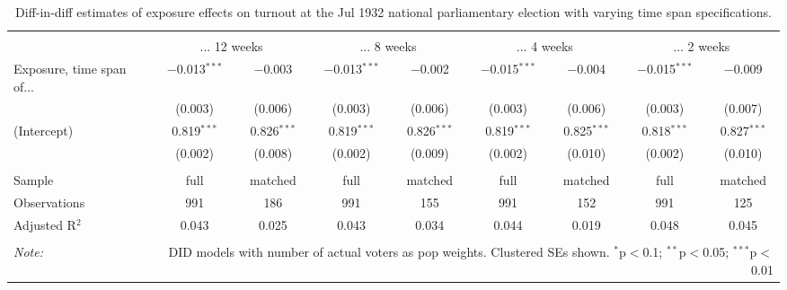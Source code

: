 
\begin{table}[!htbp] \centering 
  \caption{Diff-in-diff estimates of exposure effects on turnout at the Jul 1932 national parliamentary election with varying time span specifications.\vspace{-.25cm}} 
  \label{tab:turnout-timespan-dd-1932-1} 
\scriptsize 
\begin{tabular}{@{\extracolsep{5pt}}lcccccccc} 
\\[-1.8ex]\hline 
\hline \\[-1.8ex] 
 & \multicolumn{2}{c}{... 12 weeks} & \multicolumn{2}{c}{... 8 weeks} & \multicolumn{2}{c}{... 4 weeks} & \multicolumn{2}{c}{... 2 weeks} \\ 
 \cmidrule(r){2-3}\cmidrule(r){4-5}\cmidrule(r){6-7}\cmidrule(r){8-9}Exposure, time span of... & $-$0.013$^{***}$ & $-$0.003 & $-$0.013$^{***}$ & $-$0.002 & $-$0.015$^{***}$ & $-$0.004 & $-$0.015$^{***}$ & $-$0.009 \\ 
  & (0.003) & (0.006) & (0.003) & (0.006) & (0.003) & (0.006) & (0.003) & (0.007) \\ 
  (Intercept) & 0.819$^{***}$ & 0.826$^{***}$ & 0.819$^{***}$ & 0.826$^{***}$ & 0.819$^{***}$ & 0.825$^{***}$ & 0.818$^{***}$ & 0.827$^{***}$ \\ 
  & (0.002) & (0.008) & (0.002) & (0.009) & (0.002) & (0.010) & (0.002) & (0.010) \\ 
 \hline \\[-1.8ex] 
Sample & full & matched & full & matched & full & matched & full & matched \\ 
Observations & 991 & 186 & 991 & 155 & 991 & 152 & 991 & 125 \\ 
Adjusted R$^{2}$ & 0.043 & 0.025 & 0.043 & 0.034 & 0.044 & 0.019 & 0.048 & 0.045 \\ 
\hline 
\hline \\[-1.8ex] 
\textit{Note:}  & \multicolumn{8}{r}{DID models with number of actual voters as pop weights. Clustered SEs shown. $^{*}$p$<$0.1; $^{**}$p$<$0.05; $^{***}$p$<$0.01} \\ 
\end{tabular} 
\end{table} 
